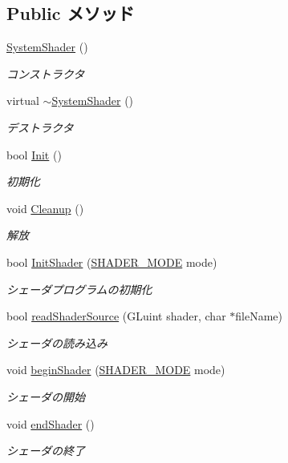 \subsection*{Public メソッド}
\begin{DoxyCompactItemize}
\item 
\hyperlink{class_system_shader_a372fad007b14e7d934913e85140bd0e1}{System\-Shader} ()
\begin{DoxyCompactList}\small\item\em コンストラクタ \end{DoxyCompactList}\item 
virtual \hyperlink{class_system_shader_aea4c03c6d6f48b122c699497523bc690}{$\sim$\-System\-Shader} ()
\begin{DoxyCompactList}\small\item\em デストラクタ \end{DoxyCompactList}\item 
bool \hyperlink{class_system_shader_ac08cac17b68ec15c287cdc96bd6e4112}{Init} ()
\begin{DoxyCompactList}\small\item\em 初期化 \end{DoxyCompactList}\item 
void \hyperlink{class_system_shader_a59985b4737cf4263cf372a4f5ea1c60d}{Cleanup} ()
\begin{DoxyCompactList}\small\item\em 解放 \end{DoxyCompactList}\item 
bool \hyperlink{class_system_shader_a0c83332ff8654ede8d80a9932e93db62}{Init\-Shader} (\hyperlink{class_system_shader_a045af48fcf9fd181b1504389a204cadc}{S\-H\-A\-D\-E\-R\-\_\-\-M\-O\-D\-E} mode)
\begin{DoxyCompactList}\small\item\em シェーダプログラムの初期化 \end{DoxyCompactList}\item 
bool \hyperlink{class_system_shader_a64a0d6a15611c301d22ee90fdb93e6f1}{read\-Shader\-Source} (G\-Luint shader, char $\ast$file\-Name)
\begin{DoxyCompactList}\small\item\em シェーダの読み込み \end{DoxyCompactList}\item 
void \hyperlink{class_system_shader_a429ec01976737272f3ed206f3c6b615e}{begin\-Shader} (\hyperlink{class_system_shader_a045af48fcf9fd181b1504389a204cadc}{S\-H\-A\-D\-E\-R\-\_\-\-M\-O\-D\-E} mode)
\begin{DoxyCompactList}\small\item\em シェーダの開始 \end{DoxyCompactList}\item 
void \hyperlink{class_system_shader_aacafa83c1f764897a12c47cc547d1a61}{end\-Shader} ()
\begin{DoxyCompactList}\small\item\em シェーダの終了 \end{DoxyCompactList}\end{DoxyCompactItemize}
